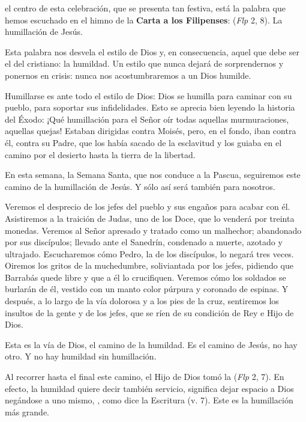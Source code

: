 \begin{body}
 el centro de esta celebración, que se presenta tan festiva, está la palabra que hemos escuchado en el himno de la \textbf{Carta a los Filipenses}:  (\textit{Flp} 2, 8). La humillación de Jesús.

Esta palabra nos desvela el estilo de Dios y, en consecuencia, aquel que debe ser el del cristiano: la humildad. Un estilo que nunca dejará de sorprendernos y ponernos en crisis: nunca nos acostumbraremos a un Dios humilde.

Humillarse es ante todo el estilo de Dios: Dios se humilla para caminar con su pueblo, para soportar sus infidelidades. Esto se aprecia bien leyendo la historia del Éxodo: ¡Qué humillación para el Señor oír todas aquellas murmuraciones, aquellas quejas! Estaban dirigidas contra Moisés, pero, en el fondo, iban contra él, contra su Padre, que los había sacado de la esclavitud y los guiaba en el camino por el desierto hasta la tierra de la libertad.

En esta semana, la Semana Santa, que nos conduce a la Pascua, seguiremos este camino de la humillación de Jesús. Y sólo así será  también para nosotros.

Veremos el desprecio de los jefes del pueblo y sus engaños para acabar con él. Asistiremos a la traición de Judas, uno de los Doce, que lo venderá por treinta monedas. Veremos al Señor apresado y tratado como un malhechor; abandonado por sus discípulos; llevado ante el Sanedrín, condenado a muerte, azotado y ultrajado. Escucharemos cómo Pedro, la  de los discípulos, lo negará tres veces. Oiremos los gritos de la muchedumbre, soliviantada por los jefes, pidiendo que Barrabás quede libre y que a él lo crucifiquen. Veremos cómo los soldados se burlarán de él, vestido con un manto color púrpura y coronado de espinas. Y después, a lo largo de la vía dolorosa y a los pies de la cruz, sentiremos los insultos de la gente y de los jefes, que se ríen de su condición de Rey e Hijo de Dios.

Esta es la vía de Dios, el camino de la humildad. Es el camino de Jesús, no hay otro. Y no hay humildad sin humillación.

Al recorrer hasta el final este camino, el Hijo de Dios tomó la  (\textit{Flp} 2, 7). En efecto, la humildad quiere decir también servicio, significa dejar espacio a Dios negándose a uno mismo, , como dice la Escritura (v. 7). Este  es la humillación más grande.


\end{body}
